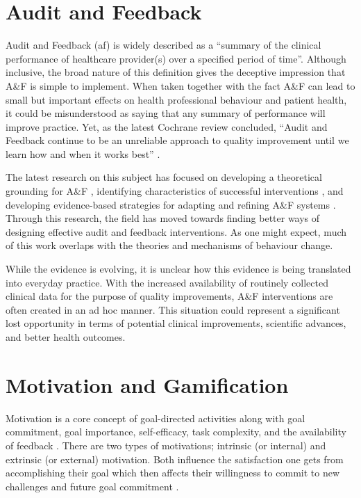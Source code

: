\section{Audit and Feedback}
Audit and Feedback (\gls{af}) is widely described as a “summary of the clinical performance of healthcare provider(s) over a specified period of time”\cite{ivers2012audit}. Although inclusive, the broad nature of this definition gives the deceptive impression that A\&F is simple to implement. When taken together with the fact A\&F can lead to small but important effects on health professional behaviour and patient health\cite{ivers2012audit}, it could be misunderstood as saying that any summary of performance will improve practice. Yet, as the latest Cochrane review concluded, “Audit and Feedback continue to be an unreliable approach to quality improvement until we learn how and when it works best” \cite{ivers2012audit}.

The latest research on this subject has focused on developing a theoretical grounding for A\&F \cite{hysong2017theory}\cite{brown2019clinical}\cite{landis2015computer}, identifying characteristics of successful interventions \cite{ivers2012audit}\cite{colquhoun2013systematic}\cite{tuti2017systematic}, and developing evidence-based strategies for adapting and refining A\&F systems \cite{brehaut2016practice}\cite{mcnamara2016confidential}. Through this research, the field has moved towards finding better ways of designing effective audit and feedback interventions. As one might expect, much of this work overlaps with the theories and mechanisms of behaviour change\cite{colquhoun2017advancing}.

While the evidence is evolving, it is unclear how this evidence is being translated into everyday practice. With the increased availability of routinely collected clinical data for the purpose of quality improvements, A\&F interventions are often created in an ad hoc manner. This situation could represent a significant lost opportunity in terms of potential clinical improvements, scientific advances, and better health outcomes.

\section{Motivation and Gamification}
Motivation is a core concept of goal-directed activities along with goal commitment, goal importance, self-efficacy, task complexity, and the availability of feedback \cite{locke2002building}.  There are two types of motivations; intrinsic (or internal) and extrinsic (or external) motivation. Both influence the satisfaction one gets from accomplishing their goal which then affects their willingness to commit to new challenges and future goal commitment \cite{locke2002building}.

